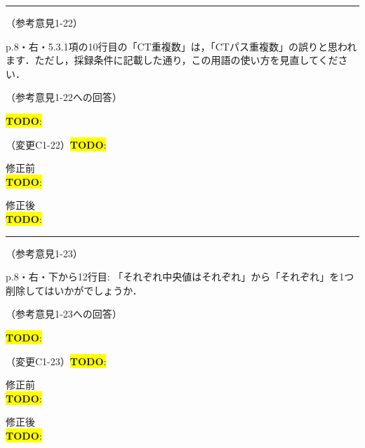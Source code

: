 \documentclass{jarticle} %
\newcommand{\todo}[1]{\colorbox{yellow}{{\bf TODO}:}{\color{blue}{\textbf{[#1]}}}}
\def\subsection#1{ \vspace{1pc} {\gt #1} }
\def\nextans{ \vspace{2pc} \hrule }
\begin{document}
\newpage
\nextans
\subsection{（参考意見1-22）}

p.8・右・5.3.1項の10行目の「CT重複数」は，「CTパス重複数」の誤りと思われます．ただし，採録条件に記載した通り，この用語の使い方を見直してください．

\subsection{（参考意見1-22への回答）}

\todo{hoge}

\subsection{（変更C1-22）\todo{hoge}}
\vspace{-0.3cm}
\begin{description}
\item 修正前\\
\phantom{　}
\todo{hoge}
\vspace{-0.3cm}
\item 修正後\\
\phantom{　}
\todo{hoge}
\end{description}

\newpage
\nextans
\subsection{（参考意見1-23）}

p.8・右・下から12行目: 「それぞれ中央値はそれぞれ」から「それぞれ」を1つ削除してはいかがでしょうか．

\subsection{（参考意見1-23への回答）}

\todo{hoge}

\subsection{（変更C1-23）\todo{hoge}}
\vspace{-0.3cm}
\begin{description}
\item 修正前\\
\phantom{　}
\todo{hoge}
\vspace{-0.3cm}
\item 修正後\\
\phantom{　}
\todo{hoge}
\end{description}
\end{document}
